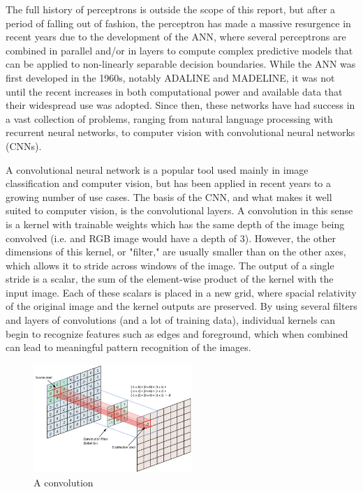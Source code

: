 \documentclass[letterpaper]{article}
\begin{document}
The full history of perceptrons is outside the scope of this report, but after a period of falling out of fashion, the perceptron has made a massive resurgence in recent years due to the development of the ANN, where several perceptrons are combined in parallel and/or in layers to compute complex 
predictive models that can be applied to non-linearly separable decision boundaries. While the ANN was first developed in the 1960s, notably 
ADALINE and MADELINE, %
it was not until the recent increases in both computational power and available data that their widespread use was adopted.
Since then, these networks have had success in a vast collection of problems, ranging from natural language processing with recurrent neural networks, to computer vision with convolutional neural networks (CNNs).  
\par
A convolutional neural network is a popular tool used mainly in image classification and computer vision, but has been applied in recent years to a 
growing number of use cases. The basis of the CNN, and what makes it well suited to computer vision, is the convolutional layers. A convolution in this 
sense is a kernel with trainable weights which has the same depth of the image being convolved (i.e. and RGB image would have a depth of 3). However, 
the other dimensions of this kernel, or "filter," are usually smaller than on the other axes, which allows it to stride across windows of the image. The output 
of a single stride is a scalar, the sum of the element-wise product of the kernel with the input image. Each of these scalars is placed in a new grid, where
spacial relativity of the original image and the kernel outputs are preserved. By using several filters and layers of convolutions (and a lot of training data),
individual kernels can begin to recognize features such as edges and foreground, which when combined can lead to meaningful pattern recognition of the 
images.
\begin{figure}[H]
	\centering
	\includegraphics[width=6cm]{convolution.png}
	\caption{A convolution \cite{pjreddie}}
\end{figure}
\end{document}

